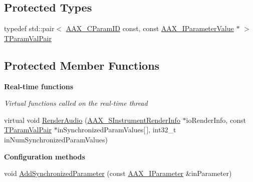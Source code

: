 \subsection*{Protected Types}
\begin{DoxyCompactItemize}
\item 
typedef std\+::pair$<$ \mbox{\hyperlink{a00392_a1440c756fe5cb158b78193b2fc1780d1}{A\+A\+X\+\_\+\+C\+Param\+ID}} const, const \mbox{\hyperlink{a01853}{A\+A\+X\+\_\+\+I\+Parameter\+Value}} $\ast$ $>$ \mbox{\hyperlink{a01969_ac0f3767546709abcf078503bc7dc636b}{T\+Param\+Val\+Pair}}
\end{DoxyCompactItemize}
\subsection*{Protected Member Functions}
\begin{Indent}\textbf{ Real-\/time functions}\par
{\em Virtual functions called on the real-\/time thread }\begin{DoxyCompactItemize}
\item 
virtual void \mbox{\hyperlink{a01969_a04f2f73d70ea28c17747c68fc3a20fc8}{Render\+Audio}} (\mbox{\hyperlink{a01965}{A\+A\+X\+\_\+\+S\+Instrument\+Render\+Info}} $\ast$io\+Render\+Info, const \mbox{\hyperlink{a01969_ac0f3767546709abcf078503bc7dc636b}{T\+Param\+Val\+Pair}} $\ast$in\+Synchronized\+Param\+Values\mbox{[}$\,$\mbox{]}, int32\+\_\+t in\+Num\+Synchronized\+Param\+Values)
\end{DoxyCompactItemize}
\end{Indent}
\begin{Indent}\textbf{ Configuration methods}\par
\begin{DoxyCompactItemize}
\item 
void \mbox{\hyperlink{a01969_a1b23573e8aa3f8e64c61813b721559c2}{Add\+Synchronized\+Parameter}} (const \mbox{\hyperlink{a01857}{A\+A\+X\+\_\+\+I\+Parameter}} \&in\+Parameter)
\end{DoxyCompactItemize}
\end{Indent}
